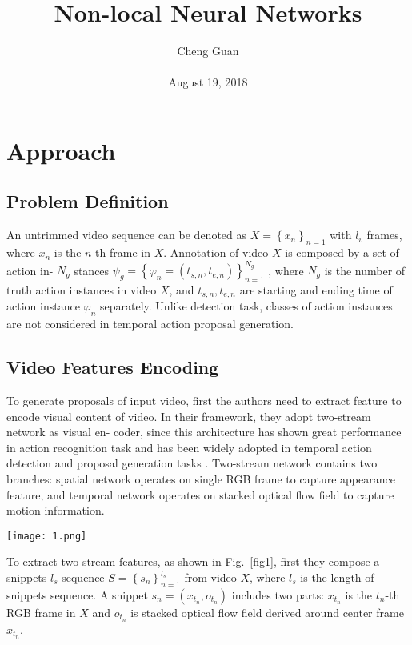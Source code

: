 \documentclass[10pt,twocolumn,letterpaper]{article}
\title{Non-local Neural Networks}
\author{Cheng Guan\\\\
August 19, 2018}
\begin{document}
\maketitle
\section{Approach}
\subsection{Problem Definition}
An untrimmed video sequence can be denoted as $X = {\left\lbrace x_n\right\rbrace}_{n=1} $
with $l_v$ frames, where
$x_n$ is the $n$-th frame in $X$. Annotation of video $X$ is composed by a set of action in-
$N_g$
stances $\psi_g = {\left\lbrace \varphi_n = \left(t_{s,n},t_{e,n}\right)\right\rbrace}_{n=1}^{N_g}$
, where $N_g$ is the number of truth action instances
in video $X$, and $t_{s,n},t_{e,n}$ are starting and ending time of action instance $\varphi_n$  separately.
Unlike detection task, classes of action instances are not considered in temporal action proposal generation.
\subsection{Video Features Encoding}
To generate proposals of input video, first the authors need to extract feature to encode visual
content of video. In their framework, they adopt two-stream network \cite{simonyan2014two} as visual en-
coder, since this architecture has shown great performance in action recognition task
\cite{wang2016temporal} and has been widely adopted in temporal action detection and proposal generation
tasks \cite{zhao2017temporal,gao2017cascaded}. Two-stream network contains two branches: spatial network operates
on single RGB frame to capture appearance feature, and temporal network operates on
stacked optical flow field to capture motion information.
\par
\begin{figure*}[b]
	\centering
	\texttt{[image: 1.png]}
	\caption{Details of proposal generation module. First, to generate
		candidate boundary locations, the authors choose temporal locations with high boundary prob-
		ability or being a probability peak. Then, they combine candidate starting and ending
		locations as proposals when their duration satisfying condition. Construct BSP feature. Given a proposal and actionness probabilities sequence, they can sample actionness
		sequence in starting, center and ending regions of proposal to construct BSP feature.}
	\label{fig1}
\end{figure*}
To extract two-stream features, as shown in Fig.~\ref{fig1}, first they compose a snippets
$l_s$
sequence $S = {\left\lbrace s_n \right\rbrace}_{n=1}^{l_s} $
from video $X$, where $l_s$ is the length of snippets sequence. A
snippet $s_n=\left(x_{t_n},o_{t_n}\right)$ includes two parts: $x_{t_n}$ is the $t_n$-th RGB frame in $X$ and $o_{t_n}$ is
stacked optical flow field derived around center frame $x_{t_n}$.
\end{document}

